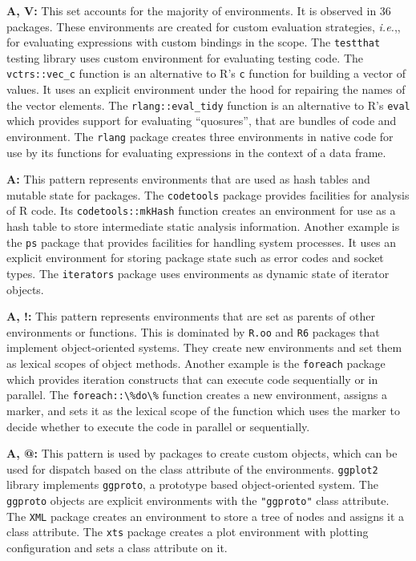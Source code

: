 \documentclass[10pt,review,sigplan,authorversion=true]{acmart}
\newcommand{\code}[1]{\lstinline |#1|\xspace}
\newcommand{\ie}{\emph{i.e.},\xspace}
\begin{document}
\noindent
\textbf{A, V:} This set accounts for the majority of environments. It is
observed in 36 packages. These environments are created for custom evaluation
strategies, \ie, for evaluating expressions with custom bindings in the scope.
The \code{testthat} testing library uses custom environment for evaluating
testing code. The \code{vctrs::vec_c} function is an alternative to R's \code{c}
function for building a vector of values. It uses an explicit environment under
the hood for repairing the names of the vector elements. The
\code{rlang::eval_tidy} function is an alternative to R's \code{eval} which
provides support for evaluating ``quosures'', that are bundles of code and
environment. The \code{rlang} package creates three environments in native code
for use by its functions for evaluating expressions in the context of a data
frame.

\noindent
\textbf{A:} This pattern represents environments that are used as hash tables
and mutable state for packages. The \code{codetools} package provides facilities
for analysis of R code. Its \code{codetools::mkHash} function creates an
environment for use as a hash table to store intermediate static analysis
information. Another example is the \code{ps} package that provides facilities
for handling system processes. It uses an explicit environment for storing
package state such as error codes and socket types. The \code{iterators} package
uses environments as dynamic state of iterator objects.

\noindent
\textbf{A, !:} This pattern represents environments that are set as parents of
other environments or functions. This is dominated by \code{R.oo} and \code{R6}
packages that implement object-oriented systems. They create new environments
and set them as lexical scopes of object methods. Another example is the
\code{foreach} package which provides iteration constructs that can execute code
sequentially or in parallel. The \code{foreach::\%do\%} function creates a new
environment, assigns a marker, and sets it as the lexical scope of the function
which uses the marker to decide whether to execute the code in parallel or
sequentially.

\noindent
\textbf{A, @:} This pattern is used by packages to create custom objects, which
can be used for dispatch based on the class attribute of the environments.
\code{ggplot2} library implements \code{ggproto}, a prototype based
object-oriented system. The \code{ggproto} objects are explicit environments
with the \code{"ggproto"} class attribute. The \code{XML} package creates an
environment to store a tree of nodes and assigns it a class attribute. The
\code{xts} package creates a plot environment with plotting configuration and
sets a class attribute on it.
\end{document}
